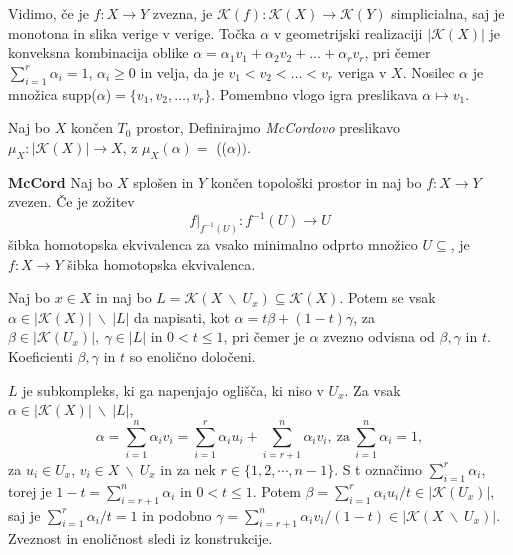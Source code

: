 \documentclass[mat1]{fmfdelo}
\begin{document}
Vidimo, če je $f\colon  X\rightarrow Y$ zvezna, je $\mathcal{K}(f)\colon \mathcal{K}(X) \rightarrow \mathcal{K}(Y)$ simplicialna, saj je monotona in slika verige v verige.
Točka $\alpha$ v geometrijski realizaciji $|\mathcal{K}(X)|$ je
konveksna kombinacija oblike
$\alpha = \alpha_1 v_1+\alpha_2v_2 + \ldots + \alpha_r v_r$, pri čemer 
$\sum_{i=1}^{r}\alpha_i=1$, $\alpha_i \ge 0$ in 
velja, da je $v_1 < v_2 < \ldots < v_r$ veriga v $X$.
Nosilec $\alpha$ je množica supp($\alpha$)$= \{v_1,v_2,\ldots,v_r\}$. Pomembno vlogo igra 
 preslikava $\alpha \mapsto v_1$.

 \begin{definicija}
    Naj bo $X$ končen $T_0$ prostor, Definirajmo
    \textit{McCordovo} preslikavo $\mu_X\colon |\mathcal{K}
    (X)|\rightarrow X$, z $\mu_X(\alpha) =$
    (($\alpha))$.
\end{definicija}



\begin{izrek}{\textbf{McCord}} %
    Naj bo $X$ splošen in $Y$ končen topološki prostor in naj bo $f\colon X\rightarrow Y$ zvezen. Če je zožitev
    $$
    f|_{f^{-1}(U)}\colon f^{-1}(U)\rightarrow U
    $$
    šibka homotopska ekvivalenca za vsako minimalno odprto množico $U\subseteq$, je $f\colon X\rightarrow Y$  šibka homotopska ekvivalenca.
\label{iz:mccord}
\end{izrek}





\begin{lema}
    Naj bo $x\in X$ in naj bo $L=\mathcal{K} (X\ \backslash \ U_x) \subseteq \mathcal{K}(X)$. Potem se vsak $\alpha \in |\mathcal{K}(X)|\ \backslash \ |L|$ da napisati, kot $\alpha = t\beta + (1-t)\gamma$, za $\beta \in |\mathcal{K}(U_x)|, \ \gamma \in |L|$ in $0<t\leq 1$, pri čemer je $\alpha$ zvezno odvisna od $\beta, \gamma$ in $t$. Koeficienti $\beta, \gamma$ in $t$ so enolično določeni.
\label{lem:sibka}
\end{lema}

\begin{dokaz}
    $L$ je subkompleks, ki ga napenjajo oglišča, ki niso v $U_x$. Za vsak $\alpha \in |\mathcal{K}(X)|\ \backslash \ |L|$, 
    $$\alpha = \sum_{i=1}^{n} \alpha_i v_i 
    = \sum_{i=1}^{r} \alpha_i u_i + \sum_{i=r+1}^{n}\alpha_i v_i,\ \text{za}\ \sum_{i=1}^{n} \alpha_i=1,
    $$
    za $u_i \in U_x$, $v_i \in X \ \backslash \ U_x$ in za nek $r\in \{1,2, \cdots, n-1\}$. S t označimo $\sum_{i=1}^{r} \alpha_i$, torej je $1-t=\sum_{i=r+1}^{n} \alpha_i$ in $0<t\leq 1$. Potem $\beta =\sum_{i=1}^{r} \alpha_i u_i/t \in |\mathcal{K}(U_x)|$, saj je $\sum_{i=1}^{r} \alpha_i/t=1$ in podobno $\gamma=\sum_{i=r+1}^{n} 
    \alpha_i v_i/(1-t) \in |\mathcal{K}(X \ \backslash \ U_x)|$. Zveznost in enoličnost sledi iz konstrukcije.

\end{dokaz}
\end{document}
